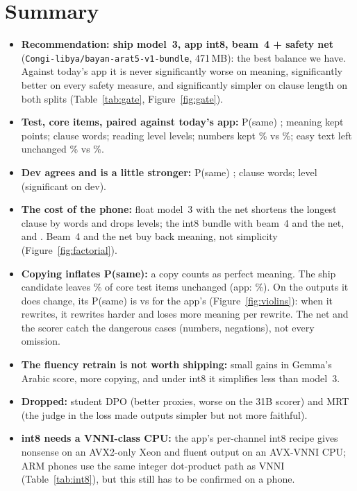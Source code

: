 \documentclass[10pt,a4paper]{article}
\newcommand{\ship}{\textbf{model~3, app int8, beam~4 + safety net}}
\begin{document}
\section{Summary}
\begin{itemize}
\item \textbf{Recommendation: ship \ship{}} (\texttt{Congi-libya/bayan-arat5-v1-bundle}, 471\,MB): the best balance we
  have. Against today's app it is never significantly worse on meaning, significantly better on every safety measure,
  and significantly simpler on clause length on both splits (Table~\ref{tab:gate}, Figure~\ref{fig:gate}).
\item \textbf{Test, core items, paired against today's app:} P(same) \TestDiffPsame; meaning kept \TestDiffKept{}
  points; clause \TestDiffClause{} words; reading level \TestDiffLevel{} levels; numbers kept \TestShipNum\% vs
  \TestAppNum\%; easy text left unchanged \TestShipEasy\% vs \TestAppEasy\%.
\item \textbf{Dev agrees and is a little stronger:} P(same) \DevDiffPsame; clause \DevDiffClause{} words; level
  \DevDiffLevel{} (significant on dev).
\item \textbf{The cost of the phone:} float model~3 with the net shortens the longest clause by \TestMnetClause{} words
  and drops \TestMnetLevel{} levels; the int8 bundle with beam~4 and the net, \TestShipClause{} and
  \TestShipLevel{}. Beam~4 and the net buy back meaning, not simplicity (Figure~\ref{fig:factorial}).
\item \textbf{Copying inflates P(same):} a copy counts as perfect meaning. The ship candidate leaves \TestShipUnch\% of
  core test items unchanged (app: \TestAppUnch\%). On the outputs it does change, its P(same) is
  \TestShipPsameChanged{} vs \TestAppPsameChanged{} for the app's (Figure~\ref{fig:violins}): when it rewrites, it
  rewrites harder and loses more meaning per rewrite. The net and the scorer catch the dangerous cases (numbers,
  negations), not every omission.
\item \textbf{The fluency retrain is not worth shipping:} small gains in Gemma's Arabic score, more copying, and under
  int8 it simplifies less than model~3.
\item \textbf{Dropped:} student DPO (better proxies, worse on the 31B scorer) and MRT (the judge in the loss made
  outputs simpler but not more faithful).
\item \textbf{int8 needs a VNNI-class CPU:} the app's per-channel int8 recipe gives nonsense on an AVX2-only Xeon and
  fluent output on an AVX-VNNI CPU; ARM phones use the same integer dot-product path as VNNI (Table~\ref{tab:int8}),
  but this still has to be confirmed on a phone.
\end{itemize}
\end{document}
